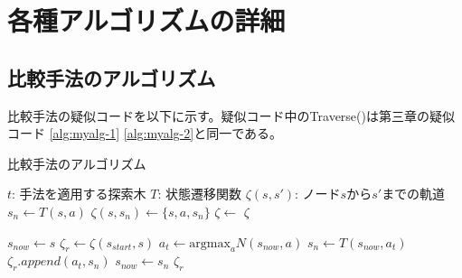 \chapter{各種アルゴリズムの詳細}
\section{比較手法のアルゴリズム}
比較手法の疑似コードを以下に示す。疑似コード中のTraverse()は第三章の疑似コード \ref{alg:myalg-1} \ref{alg:myalg-2}と同一である。
\begin{algorithm}
    \caption{比較手法のアルゴリズム}
    \begin{algorithmic}[1]       
        \State $t$: 手法を適用する探索木
        \State $T$: 状態遷移関数
        \State $\zeta(s, s')$: ノード$s$から$s'$までの軌道
           \State $s_n \gets T(s, a)$
           \State $\zeta(s, s_n) \gets \{s, a, s_n\}$
           \State $\zeta \gets$ 
           \Return $\zeta$
        \EndFunction
        
            \State $s_{now} \gets s$
            \State $\zeta_r \gets \zeta(s_{start}, s)$
                \State $a_t \gets \textrm{argmax}_a N(s_{now}, a)$
                \State $s_n \gets T(s_{now}, a_t)$
                \State $\zeta_r.append({a_t, s_n})$
                \State $s_{now} \gets s_n$
            \EndWhile
            \Return $\zeta_r$
        \EndFunction
       
        
    \end{algorithmic}
\end{algorithm}


